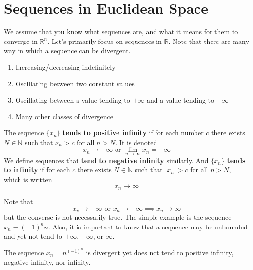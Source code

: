 \section{Sequences in Euclidean Space} 

  We assume that you know what sequences are, and what it means for them to converge in $\mathbb{R}^n$. Let's primarily focus on sequences in $\mathbb{R}$. Note that there are many way in which a sequence can be divergent. 
  \begin{enumerate}
    \item Increasing/decreasing indefinitely
    \item Oscillating between two constant values
    \item Oscillating between a value tending to $+\infty$ and a value tending to $-\infty$
    \item Many other classes of divergence
  \end{enumerate}

  \begin{definition}
    \label{def:sequence-tending-to-infinity}
    The sequence $\{x_n\}$ \textbf{tends to positive infinity} if for each number $c$ there exists $N \in \mathbb{N}$ such that $x_n > c$ for all $n > N$. It is denoted 
    \begin{equation}
      x_n \rightarrow + \infty \text{ or } \lim_{n \rightarrow \infty} x_n = + \infty
    \end{equation}
    We define sequences that \textbf{tend to negative infinity} similarly. And $\{x_n\}$ \textbf{tends to infinity} if for each $c$ there exists $N \in \mathbb{N}$ such that $|x_n| > c$ for all $n > N$, which is written 
    \begin{equation}
      x_n \rightarrow \infty
    \end{equation}
  \end{definition}

  Note that 
  \begin{equation}
    x_n \rightarrow +\infty \text{ or } x_n \rightarrow -\infty \implies x_n \rightarrow \infty
  \end{equation}
  but the converse is not necessarily true. The simple example is the sequence $x_n = (-1)^n n$. Also, it is important to know that a sequence may be unbounded and yet not tend to $+\infty$, $-\infty$, or $\infty$. 

  \begin{example}
    \label{ex:unbounded-sequence-that-doesnt-tend-to-infty}
    The sequence $x_n = n^{(-1)^n}$ is divergent yet does not tend to positive infinity, negative infinity, nor infinity. 
  \end{example} 

